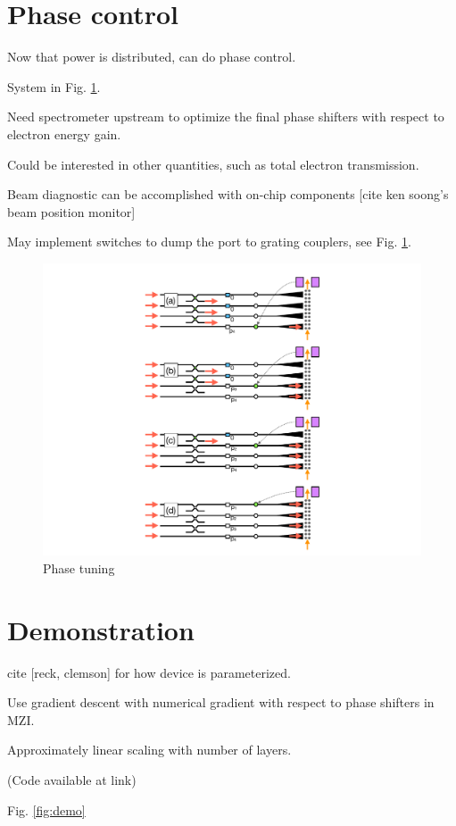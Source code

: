 \documentclass[%
 reprint,
 amsmath,amssymb,
 aps,
prstab,
floatfix,
]{revtex4-1}
\begin{document}
\section{\label{sec:phase}Phase control}

Now that power is distributed, can do phase control.

System in Fig. \ref{fig:phase}.

Need spectrometer upstream to optimize the final phase shifters with respect to electron energy gain.

Could be interested in other quantities, such as total electron transmission.

Beam diagnostic can be accomplished with on-chip components [cite ken soong's beam position monitor]

May implement switches to dump the port to grating couplers, see Fig. \ref{fig:phase}.
\begin{figure}
\includegraphics[width=0.75\columnwidth]{phase_tuning}
\caption{\label{fig:phase} Phase tuning}
\end{figure}

\section{\label{sec:demo}Demonstration}

cite [reck, clemson] for how device is parameterized.

Use gradient descent with numerical gradient with respect to phase shifters in MZI.

Approximately linear scaling with number of layers.

(Code available at link)

Fig. \ref{fig:demo}
\end{document}
